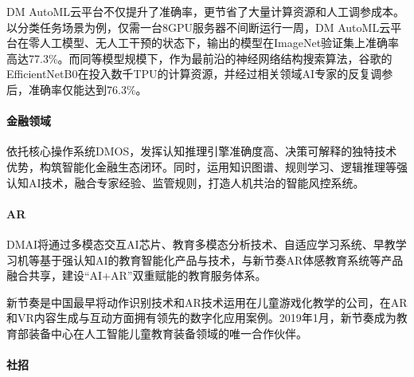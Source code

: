 \documentclass[letterpaper,11pt,english]{sphinxmanual}
\begin{document}
DM
AutoML云平台不仅提升了准确率，更节省了大量计算资源和人工调参成本。以分类任务场景为例，仅需一台8GPU服务器不间断运行一周，DM
AutoML云平台在零人工模型、无人工干预的状态下，输出的模型在ImageNet验证集上准确率高达77.3\%。而同等模型规模下，作为最前沿的神经网络结构搜索算法，谷歌的EfficientNetB0在投入数千TPU的计算资源，并经过相关领域AI专家的反复调参后，准确率仅能达到76.3\%。


\paragraph{金融领域}
\label{\detokenize{chapter_dive/dm-ai:id12}}
依托核心操作系统DMOS，发挥认知推理引擎准确度高、决策可解释的独特技术优势，构筑智能化金融生态闭环。同时，运用知识图谱、规则学习、逻辑推理等强认知AI技术，融合专家经验、监管规则，打造人机共治的智能风控系统。


\paragraph{AR}
\label{\detokenize{chapter_dive/dm-ai:ar}}
DMAI将通过多模态交互AI芯片、教育多模态分析技术、自适应学习系统、早教学习机等基于强认知AI的教育智能化产品与技术，与新节奏AR体感教育系统等产品融合共享，建设“AI+AR”双重赋能的教育服务体系。

新节奏是中国最早将动作识别技术和AR技术运用在儿童游戏化教学的公司，在AR和VR内容生成与互动方面拥有领先的数字化应用案例。2019年1月，新节奏成为教育部装备中心在人工智能儿童教育装备领域的唯一合作伙伴。


\paragraph{社招}
\label{\detokenize{chapter_dive/dm-ai:id13}}



\renewcommand{\indexname}{Index}
\printindex
\end{document}
